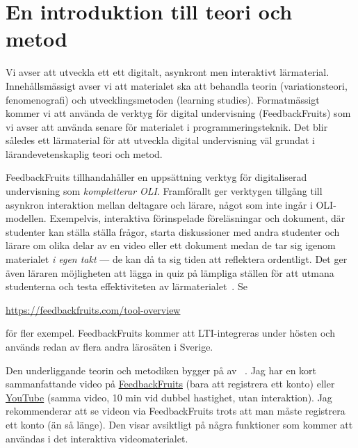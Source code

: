 \documentclass[a4paper,swedish]{article}
\begin{document}
\section{En introduktion till teori och metod}\label{intrometod}

Vi avser att utveckla ett ett digitalt, asynkront men interaktivt lärmaterial.
Innehållsmässigt avser vi att materialet ska att behandla teorin 
(variationsteori, fenomenografi) och utvecklingsmetoden (learning studies).
Formatmässigt kommer vi att använda de verktyg för digital undervisning 
(FeedbackFruits) som vi avser att använda senare för materialet i 
programmeringsteknik.
Det blir således ett lärmaterial för att utveckla digital undervisning väl 
grundat i lärandevetenskaplig teori och metod.

FeedbackFruits tillhandahåller en uppsättning verktyg för digitaliserad 
undervisning som \emph{kompletterar OLI}.
Framförallt ger verktygen tillgång till asynkron interaktion mellan deltagare 
och lärare, något som inte ingår i OLI-modellen.
Exempelvis, interaktiva förinspelade föreläsningar och dokument, där studenter 
kan ställa ställa frågor, starta diskussioner med andra studenter och lärare om 
olika delar av en video eller ett dokument medan de tar sig igenom materialet 
\emph{i egen takt} --- de kan då ta sig tiden att reflektera ordentligt.
Det ger även läraren möjligheten att lägga in quiz på lämpliga ställen för att 
utmana studenterna och testa effektiviteten av 
lärmaterialet~\parencite{NecessaryConditionsOfLearning}.
Se
\begin{center}
  \url{https://feedbackfruits.com/tool-overview}
\end{center}
för fler exempel.
FeedbackFruits kommer att LTI-integreras under hösten och används redan av 
flera andra lärosäten i Sverige.

Den underliggande teorin och metodiken bygger på
av 
\citeauthor{NecessaryConditionsOfLearning}~\parencite*{NecessaryConditionsOfLearning}.
Jag har en kort sammanfattande video på
\href{https://eu.feedbackfruits.com/groups/activity-course/d04b0280-e219-42c4-aee1-1272609bc4bd}{FeedbackFruits} 
(bara att registrera ett konto)
eller
\href{https://youtu.be/_d42-kTKDcI}{YouTube}
(samma video, 10 min vid dubbel hastighet, utan interaktion).
Jag rekommenderar att se videon via FeedbackFruits trots att man måste 
registrera ett konto (än så länge). Den visar avsiktligt på några funktioner 
som kommer att användas i det interaktiva videomaterialet. 
\end{document}
